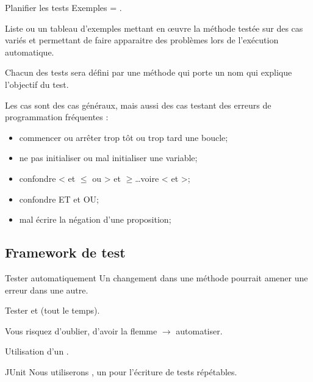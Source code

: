 \begin{hideedit}
\begin{frame}{Planifier les tests}
  Exemples = .
\end{frame}

\begin{frame}
  \begin{definition}
    Liste ou un tableau d'exemples mettant en œuvre la méthode testée sur
    des cas variés et permettant de faire apparaitre des problèmes lors
    de l'exécution automatique.

    Chacun des tests sera défini par une méthode qui porte un nom
    qui explique l'objectif du test.
  \end{definition}

  \pause
  Les cas sont des cas généraux, mais aussi des cas testant des erreurs
  de programmation fréquentes :
  \begin{itemize}
    \item commencer ou arrêter trop tôt ou trop tard une boucle;
    \item ne pas initialiser ou mal initialiser une variable;
    \item confondre < et $\le$ ou > et $\ge$\dots voire < et >;
    \item confondre ET et OU;
    \item mal écrire la négation d'une proposition;
  \end{itemize}

\end{frame}

\subsection{Framework de test}
\begin{frame}{Tester automatiquement}
  Un changement dans une méthode pourrait amener une erreur dans une autre.

  \pause
  Tester  et  (tout le temps).

  \pause
  Vous risquez d'oublier, d'avoir la flemme \(\rightarrow\) automatiser.

  \pause
  Utilisation d'un .

\end{frame}

\begin{frame}[fragile]{JUnit}
  Nous utiliserons , un \textit{} pour
  l'écriture de tests répétables.


\end{frame}
\end{hideedit}
